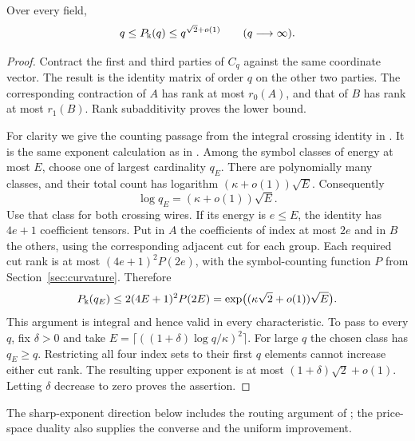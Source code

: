 \begin{lemma}\label{lem:pt-upper}
Over every field,
\[
 q\leq P_\Bbbk(q)\leq q^{\sqrt2+o(1)}\qquad(q\longrightarrow\infty).
\]
\end{lemma}
\begin{proof}
Contract the first and third parties of $C_q$ against the same
coordinate vector. The result is the identity matrix of order
$q$ on the other two parties. The corresponding contraction
of $A$ has rank at most $r_0(A)$, and that of $B$ has rank at
most $r_1(B)$. Rank subadditivity proves the lower bound.

For clarity we give the counting passage from the integral
crossing identity in \cite[Proposition B.2]{Anthropic2026}.
It is the same exponent calculation as in
\cite[Lemma 1 and Corollary 3]{Khoruzhii2026}.
Among the symbol classes of energy at most $E$, choose one of
largest cardinality $q_E$. There are polynomially many classes,
and their total count has logarithm $(\kappa+o(1))\sqrt E$.
Consequently
\[
 \log q_E=(\kappa+o(1))\sqrt E.
\]
Use that class for both crossing wires. If its energy is $e\leq E$,
the identity has $4e+1$ coefficient tensors. Put in $A$ the
coefficients of index at most $2e$ and in $B$ the others,
using the corresponding adjacent cut for each group.
Each required cut rank is at most
$(4e+1)^2P(2e)$, with the symbol-counting function $P$
from Section~\ref{sec:curvature}. Therefore
\[
 P_\Bbbk(q_E)\leq 2(4E+1)^2P(2E)
             =\exp\bigl((\kappa\sqrt2+o(1))\sqrt E\bigr).
\]
This argument is integral and hence valid in every characteristic.
To pass to every $q$, fix $\delta>0$ and take
$E=\lceil((1+\delta)\log q/\kappa)^2\rceil$.
For large $q$ the chosen class has $q_E\geq q$.
Restricting all four index sets to their first $q$ elements
cannot increase either cut rank. The resulting upper exponent
is at most $(1+\delta)\sqrt2+o(1)$.
Letting $\delta$ decrease to zero proves the assertion.
\end{proof}

The sharp-exponent direction below includes the routing argument
of \cite[Section 2, p.~3]{Liu2026noncommutative}; the price-space
duality also supplies the converse and the uniform improvement.

